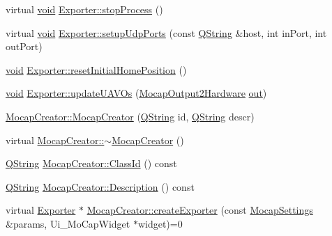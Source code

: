 \begin{DoxyCompactItemize}
\item 
virtual \hyperlink{group___u_a_v_objects_plugin_ga444cf2ff3f0ecbe028adce838d373f5c}{void} \hyperlink{group___mo_cap_plugin_gad00fa0512ade28ce7c6e08f2e4254b59}{\-Exporter\-::stop\-Process} ()
\item 
virtual \hyperlink{group___u_a_v_objects_plugin_ga444cf2ff3f0ecbe028adce838d373f5c}{void} \hyperlink{group___mo_cap_plugin_ga8790a68ca0c9e28691948cb19eba005d}{\-Exporter\-::setup\-Udp\-Ports} (const \hyperlink{group___u_a_v_objects_plugin_gab9d252f49c333c94a72f97ce3105a32d}{\-Q\-String} \&host, int in\-Port, int out\-Port)
\item 
\hyperlink{group___u_a_v_objects_plugin_ga444cf2ff3f0ecbe028adce838d373f5c}{void} \hyperlink{group___mo_cap_plugin_ga4bed3f9d105ae145815a651f02083ea0}{\-Exporter\-::reset\-Initial\-Home\-Position} ()
\item 
\hyperlink{group___u_a_v_objects_plugin_ga444cf2ff3f0ecbe028adce838d373f5c}{void} \hyperlink{group___mo_cap_plugin_ga6ac428e6d5db8fba507314cc56783821}{\-Exporter\-::update\-U\-A\-V\-Os} (\hyperlink{struct_mocap_output2_hardware}{\-Mocap\-Output2\-Hardware} \hyperlink{uavobjecttemplate_8m_a2a89187d8e8e8fba509ef9ab5f815d88}{out})
\item 
\hyperlink{group___mo_cap_plugin_ga90d59062e3d2c753e512451b60a977e8}{\-Mocap\-Creator\-::\-Mocap\-Creator} (\hyperlink{group___u_a_v_objects_plugin_gab9d252f49c333c94a72f97ce3105a32d}{\-Q\-String} id, \hyperlink{group___u_a_v_objects_plugin_gab9d252f49c333c94a72f97ce3105a32d}{\-Q\-String} descr)
\item 
virtual \hyperlink{group___mo_cap_plugin_ga934741ed7c6804f46b162987c2b9b5c8}{\-Mocap\-Creator\-::$\sim$\-Mocap\-Creator} ()
\item 
\hyperlink{group___u_a_v_objects_plugin_gab9d252f49c333c94a72f97ce3105a32d}{\-Q\-String} \hyperlink{group___mo_cap_plugin_ga775e3a65e804fbbeba1680da9b949286}{\-Mocap\-Creator\-::\-Class\-Id} () const 
\item 
\hyperlink{group___u_a_v_objects_plugin_gab9d252f49c333c94a72f97ce3105a32d}{\-Q\-String} \hyperlink{group___mo_cap_plugin_ga0eb79ab6540fef8926129b47aef0a2a8}{\-Mocap\-Creator\-::\-Description} () const 
\item 
virtual \hyperlink{class_exporter}{\-Exporter} $\ast$ \hyperlink{group___mo_cap_plugin_gaa300503bdf633291aeab43797cc61939}{\-Mocap\-Creator\-::create\-Exporter} (const \hyperlink{group___mo_cap_plugin_ga6083347a5b3eb70e360f599354dc0f0b}{\-Mocap\-Settings} \&params, \-Ui\-\_\-\-Mo\-Cap\-Widget $\ast$widget)=0

\end{DoxyCompactItemize}
